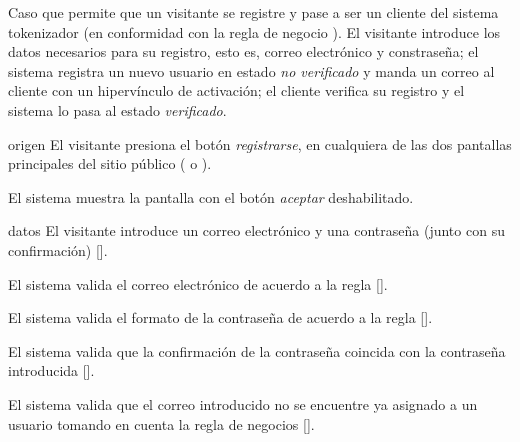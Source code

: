 %
%

{
  Caso que permite que un visitante se registre y pase a ser
  un cliente del sistema tokenizador (en conformidad con la regla de negocio
  ). El visitante introduce los datos
  necesarios para su registro, esto es, correo electrónico y constraseña; el
  sistema registra un nuevo usuario en estado \textit{no verificado} y manda un
  correo al cliente con un hipervínculo de activación; el cliente verifica su
  registro y el sistema lo pasa al estado \textit{verificado}.

  \begin{trayectoriaPrincipal}

    \item[origen] El visitante presiona el botón \textit{registrarse}, en
      cualquiera de las dos pantallas principales del sitio público
      ( o ).

    \item El sistema muestra la pantalla
       con el botón \textit{aceptar}
      deshabilitado.

    \item[datos] El visitante introduce un correo electrónico y una contraseña
      (junto con su confirmación) [].

    \item El sistema valida el correo electrónico de acuerdo a la regla
      [].

    \item El sistema valida el formato de la contraseña de acuerdo a la regla
      [].

    \item El sistema valida que la confirmación de la contraseña coincida con
      la contraseña introducida
      [].

    \item El sistema valida que el correo introducido no se encuentre ya asignado
      a un usuario tomando en cuenta la regla de negocios
       [].


\end{trayectoriaPrincipal}}
